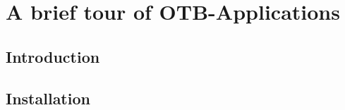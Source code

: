 \chapter{A brief tour of OTB-Applications}\label{chap:otb-applications}

\section{Introduction}\label{sec:appintro}


\section{Installation}\label{sec:appinstall}
